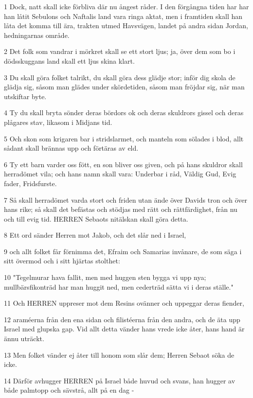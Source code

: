 \par 1 Dock, natt skall icke förbliva där nu ångest råder. I den förgångna tiden har har han låtit Sebulons och Naftalis land vara ringa aktat, men i framtiden skall han låta det komma till ära, trakten utmed Havsvägen, landet på andra sidan Jordan, hedningarnas område.
\par 2 Det folk som vandrar i mörkret skall se ett stort ljus; ja, över dem som bo i dödsskuggans land skall ett ljus skina klart.
\par 3 Du skall göra folket talrikt, du skall göra dess glädje stor; inför dig skola de glädja sig, såsom man glädes under skördetiden, såsom man fröjdar sig, när man utskiftar byte.
\par 4 Ty du skall bryta sönder deras bördors ok och deras skuldrors gissel och deras plågares stav, likasom i Midjans tid.
\par 5 Och skon som krigaren bar i stridslarmet, och manteln som sölades i blod, allt sådant skall brännas upp och förtäras av eld.
\par 6 Ty ett barn varder oss fött, en son bliver oss given, och på hans skuldror skall herradömet vila; och hans namn skall vara: Underbar i råd, Väldig Gud, Evig fader, Fridsfurste.
\par 7 Så skall herradömet varda stort och friden utan ände över Davids tron och över hans rike; så skall det befästas och stödjas med rätt och rättfärdighet, från nu och till evig tid. HERREN Sebaots nitälskan skall göra detta.
\par 8 Ett ord sänder Herren mot Jakob, och det slår ned i Israel,
\par 9 och allt folket får förnimma det, Efraim och Samarias invånare, de som säga i sitt övermod och i sitt hjärtas stolthet:
\par 10 "Tegelmurar hava fallit, men med huggen sten bygga vi upp nya; mullbärsfikonträd har man huggit ned, men cederträd sätta vi i deras ställe."
\par 11 Och HERREN uppreser mot dem Resins ovänner och uppeggar deras fiender,
\par 12 araméerna från den ena sidan och filistéerna från den andra, och de äta upp Israel med glupska gap. Vid allt detta vänder hans vrede icke åter, hans hand är ännu uträckt.
\par 13 Men folket vänder ej åter till honom som slår dem; Herren Sebaot söka de icke.
\par 14 Därför avhugger HERREN på Israel både huvud och svans, han hugger av både palmtopp och sävstrå, allt på en dag -
